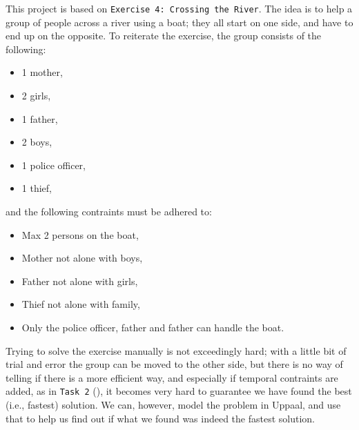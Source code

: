This project is based on \texttt{Exercise 4: Crossing the River}. The idea is to help a group of people across a river using a boat; they all start on one side, and have to end up on the opposite. To reiterate the exercise, the group consists of the following:
\begin{itemize}
\setlength\itemsep{.1em}
	\item 1 mother,
	\item 2 girls,
	\item 1 father,
	\item 2 boys,
	\item 1 police officer,
	\item 1 thief,
\end{itemize}

\noindent and the following contraints must be adhered to:

\begin{itemize}
\setlength\itemsep{.1em}
	\item Max 2 persons on the boat,
	\item Mother not alone with boys,
	\item Father not alone with girls,
	\item Thief not alone with family,
	\item Only the police officer, father and father can handle the boat.
\end{itemize}

\noindent Trying to solve the exercise manually is not exceedingly hard; with a little bit of trial and error the group can be moved to the other side, but there is no way of telling if there is a more efficient way, and especially if temporal contraints are added, as in \texttt{Task 2} (), it becomes very hard to guarantee we have found the best (i.e., fastest) solution. We can, however, model the problem in Uppaal, and use that to help us find out if what we found was indeed the fastest solution.